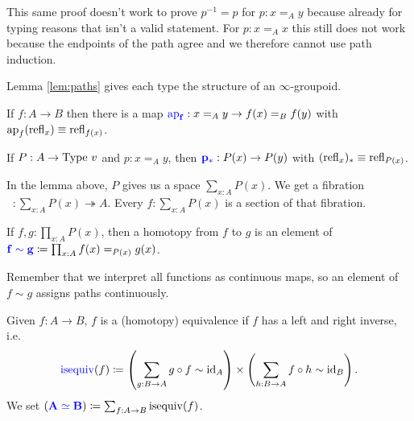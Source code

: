 \begin{rem}
    This same proof doesn't work to prove $p^{-1} = p$ for $p : x \mathrel{=_A} y$ because already for typing reasons that isn't a valid statement. 
    For $p : x \mathrel{=_A} x$ this still does not work because the endpoints of the path agree and we therefore cannot use path induction.
\end{rem}

\begin{rem}
    Lemma \ref{lem:paths} gives each type the structure of an $\infty$-groupoid. 
\end{rem}

\begin{boxlem}
    If $f : A \to B$ then there is a map $\alert{\mathop{\operatorname{ap}_f}} : x \mathrel{=_A} y \to f(x) \mathrel{=_B} f(y)$ with $\mathop{\operatorname{ap}_f}(\operatorname{refl}_{x}) \equiv \operatorname{refl}_{f(x)}$.
\end{boxlem}

\begin{boxlem}
    If $P : A \to \mathrm{Type}\ v$ and $p : x \mathrel{=_A} y$, then $\alert{p_*} : P(x) \to P(y)$ with $(\operatorname{refl}_{x})_* \equiv \operatorname{refl}_{P(x)}$.
\end{boxlem}

\begin{rem}
    In the lemma above, $P$ gives us a space $\sum_{x : A} P(x)$. 
    We get a fibration $\mathop{\pi_1} : \sum_{x : A} P(x) \twoheadrightarrow A$. 
    Every $f : \sum_{x : A} P(x)$ is a section of that fibration. 
\end{rem}

\begin{boxdefi}
    If $f, g : \prod_{x : A} P(x)$, then a \alert{homotopy} from $f$ to $g$ is an element of $\alert{f \sim g} \coloneq \prod_{x : A} f(x) \mathrel{=_{P(x)}} g(x)$.
\end{boxdefi}

\begin{rem}
    Remember that we interpret all functions as continuous maps, so an element of $f \sim g$ assigns paths continuously. 
\end{rem}

\begin{boxdefi}
    Given $f : A \to B$, $f$ is a \alert{(homotopy) equivalence} if $f$ has a left and right inverse, i.e.\
    \begin{equation*}
        \alert{\operatorname{isequiv}}(f) \coloneq \left( \sum_{g : B \to A} g \circ f \sim \id_A \right) \times \left( \sum_{h : B \to A} f \circ h \sim \id_B \right).
    \end{equation*}
    We set $(\alert{A \simeq B}) \coloneq \sum_{f : A \to B} \operatorname{isequiv}(f)$.
\end{boxdefi}

